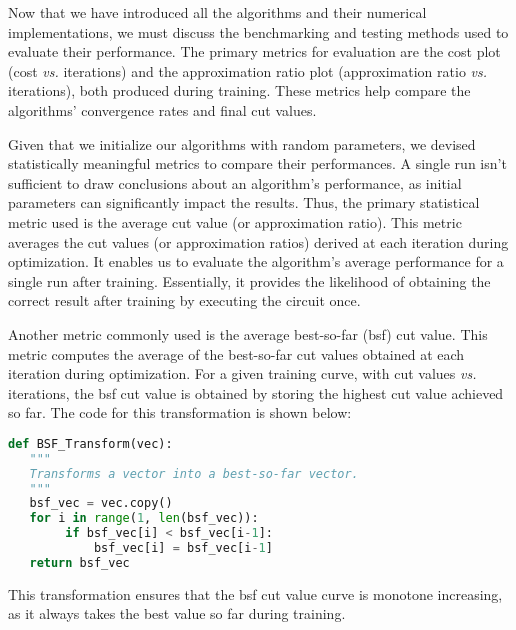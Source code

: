 

Now that we have introduced all the algorithms and their numerical implementations, we must discuss the benchmarking and testing methods used to evaluate their performance. The primary metrics for evaluation are the cost plot (cost \textit{vs.} iterations) and the approximation ratio plot (approximation ratio \textit{vs.} iterations), both produced during training. These metrics help compare the algorithms' convergence rates and final cut values.

Given that we initialize our algorithms with random parameters, we devised statistically meaningful metrics to compare their performances. A single run isn't sufficient to draw conclusions about an algorithm's performance, as initial parameters can significantly impact the results. Thus, the primary statistical metric used is the average cut value (or approximation ratio). This metric averages the cut values (or approximation ratios) derived at each iteration during optimization. It enables us to evaluate the algorithm's average performance for a single run after training. Essentially, it provides the likelihood of obtaining the correct result after training by executing the circuit once. 

Another metric commonly used is the average best-so-far (\acrshort{bsf}) cut value. This metric computes the average of the best-so-far cut values obtained at each iteration during optimization. For a given training curve, with cut values \textit{vs.} iterations, the \acrshort{bsf} cut value is obtained by storing the highest cut value achieved so far. The code for this transformation is shown below:

\begin{lstlisting}[language=Python, style=My_Python, caption={Auxiliary function: best-so-far transformation}, label={lst:bsf_transform}]
def BSF_Transform(vec):
   """
   Transforms a vector into a best-so-far vector.
   """
   bsf_vec = vec.copy()
   for i in range(1, len(bsf_vec)):
        if bsf_vec[i] < bsf_vec[i-1]:
            bsf_vec[i] = bsf_vec[i-1]
   return bsf_vec
\end{lstlisting}
This transformation ensures that the \acrshort{bsf} cut value curve is monotone increasing, as it always takes the best value so far during training.

